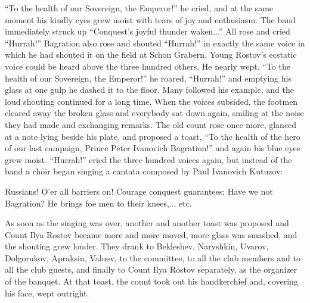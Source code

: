 ``To the health of our Sovereign, the Emperor!'' he cried, and at
the same moment his kindly eyes grew moist with tears of joy and
enthusiasm. The band immediately struck up ``Conquest's joyful
thunder waken...'' All rose and cried ``Hurrah!'' Bagration also
rose and shouted ``Hurrah!'' in exactly the same voice in which
he had shouted it on the field at Schon Grabern.  Young Rostov's
ecstatic voice could be heard above the three hundred others. He
nearly wept. ``To the health of our Sovereign, the Emperor!''  he
roared, ``Hurrah!'' and emptying his glass at one gulp he dashed
it to the floor. Many followed his example, and the loud shouting
continued for a long time. When the voices subsided, the footmen
cleared away the broken glass and everybody sat down again,
smiling at the noise they had made and exchanging remarks. The
old count rose once more, glanced at a note lying beside his
plate, and proposed a toast, ``To the health of the hero of our
last campaign, Prince Peter Ivanovich Bagration!'' and again his
blue eyes grew moist. ``Hurrah!'' cried the three hundred voices
again, but instead of the band a choir began singing a cantata
composed by Paul Ivanovich Kutuzov:

Russians! O'er all barriers on! Courage conquest guarantees; Have
we not Bagration? He brings foe men to their knees,... etc.

As soon as the singing was over, another and another toast was
proposed and Count Ilya Rostov became more and more moved, more
glass was smashed, and the shouting grew louder. They drank to
Bekleshev, Naryshkin, Uvarov, Dolgorukov, Apraksin, Valuev, to
the committee, to all the club members and to all the club
guests, and finally to Count Ilya Rostov separately, as the
organizer of the banquet. At that toast, the count took out his
handkerchief and, covering his face, wept outright.



